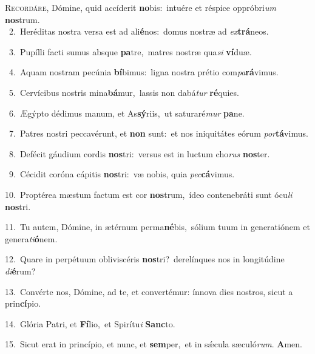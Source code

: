 \lettrine{\initial\textcolor{\initialcolor}{R}}{ecordáre,} Dómine, quid accíderit \textbf{no}\-bis:~\star intuére et réspice oppróbri\textit{um} \textbf{nos}\-trum.\\
{\numbfont\textcolor{\numbcolor}{~2.}}~Heréditas nostra versa est ad ali\-\textbf{é}\-nos:~\star domus nostræ ad \textit{ex}\-\textbf{trá}neos.\par
{\numbfont\textcolor{\numbcolor}{~3.}}~Pupílli facti sumus absque \textbf{pa}\-tre,~\star matres nostræ qua\textit{si} \textbf{ví}\-duæ.\par
{\numbfont\textcolor{\numbcolor}{~4.}}~Aquam nostram pecúnia \textbf{bí}\-bimus:~\star ligna nostra prétio com\-\textit{pa}\-\textbf{rá}vimus.\par
{\numbfont\textcolor{\numbcolor}{~5.}}~Cervícibus nostris mina\-\textbf{bá}\-mur,~\star lassis non dabá\textit{tur} \textbf{ré}\-quies.\par
{\numbfont\textcolor{\numbcolor}{~6.}}~Ægýpto dédimus manum, et As\-\textbf{sý}\-riis,~\star ut saturaré\textit{mur} \textbf{pa}\-ne.\par
{\numbfont\textcolor{\numbcolor}{~7.}}~Patres nostri peccavérunt, et \textbf{non} sunt:~\star et nos iniquitátes eórum \textit{por}\-\textbf{tá}vimus.\par
{\numbfont\textcolor{\numbcolor}{~8.}}~Defécit gáudium cordis \textbf{nos}\-tri:~\star versus est in luctum cho\textit{rus} \textbf{nos}\-ter.\par
{\numbfont\textcolor{\numbcolor}{~9.}}~Cécidit coróna cápitis \textbf{nos}\-tri:~\star væ nobis, quia \textit{pec}\-\textbf{cá}vimus.\par
{\numbfont\textcolor{\numbcolor}{10.}}~Proptérea mæstum factum est cor \textbf{nos}\-trum,~\star ídeo contenebráti sunt ócu\textit{li} \textbf{nos}\-tri.\par
{\numbfont\textcolor{\numbcolor}{11.}}~Tu autem, Dómine, in ætérnum perma\-\textbf{né}\-bis,~\star sólium tuum in generatiónem et genera\-\textit{ti}\-\textbf{ó}nem.\par
{\numbfont\textcolor{\numbcolor}{12.}}~Quare in perpétuum obliviscéris \textbf{nos}\-tri?~\star derelínques nos in longitúdine \textit{di}\-\textbf{é}rum?\par
{\numbfont\textcolor{\numbcolor}{13.}}~Convérte nos, Dómine, ad te, et convertémur: ínnova dies nostros, sicut a prin\-\textbf{cí}\-pio.\par
{\numbfont\textcolor{\numbcolor}{14.}}~Glória Patri, et \textbf{Fí}\-lio,~\star et Spirítu\textit{i} \textbf{Sanc}\-to.\par
{\numbfont\textcolor{\numbcolor}{15.}}~Sicut erat in princípio, et nunc, et \textbf{sem}\-per,~\star et in sǽcula sæculó\-\textit{rum}\-. \textbf{A}\-men.\par
